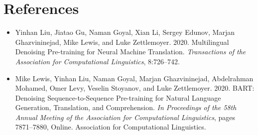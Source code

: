 \documentclass[11pt]{article}
\begin{document}


\section*{References}
\begin{itemize}
    \item Yinhan Liu, Jiatao Gu, Naman Goyal, Xian Li, Sergey Edunov, Marjan Ghazvininejad, Mike Lewis, and Luke Zettlemoyer. 2020. Multilingual Denoising Pre-training for Neural Machine Translation. \textit{Transactions of the Association for Computational Linguistics}, 8:726–742.
    \item Mike Lewis, Yinhan Liu, Naman Goyal, Marjan Ghazvininejad, Abdelrahman Mohamed, Omer Levy, Veselin Stoyanov, and Luke Zettlemoyer. 2020. BART: Denoising Sequence-to-Sequence Pre-training for Natural Language Generation, Translation, and Comprehension. \textit{In Proceedings of the 58th Annual Meeting of the Association for Computational Linguistics}, pages 7871–7880, Online. Association for Computational Linguistics.
\end{itemize}
\end{document}
